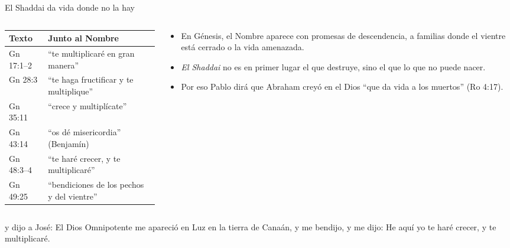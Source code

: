 \begin{frame}{El Shaddai da vida donde no la hay}
\begin{columns}[c,onlytextwidth]
\begin{column}{0.50\textwidth}
\scriptsize\renewcommand{\arraystretch}{1.15}
\begin{tabular}{@{}>{\RaggedRight\arraybackslash}p{1.5cm}>{\RaggedRight\arraybackslash}p{4.3cm}@{}}
\toprule
\textbf{Texto} & \textbf{Junto al Nombre} \\ \midrule
Gn 17:1--2 & ``te multiplicaré en gran manera'' \\
Gn 28:3 & ``te haga fructificar y te multiplique'' \\
Gn 35:11 & ``crece y multiplícate'' \\
Gn 43:14 & ``os dé misericordia'' (Benjamín) \\
Gn 48:3--4 & ``te haré crecer, y te multiplicaré'' \\
Gn 49:25 & ``bendiciones de los pechos y del vientre'' \\
\bottomrule
\end{tabular}
\end{column}
\begin{column}{0.48\textwidth}\small
\begin{itemize}
\item En Génesis, el Nombre aparece  con promesas de descendencia, a familias donde el vientre está cerrado o la vida amenazada.
\item \emph{El Shaddai} no es en primer lugar el que destruye, sino el que  lo que no puede nacer.
\item Por eso Pablo dirá que Abraham creyó en el Dios ``que da vida a los muertos'' (Ro 4:17).
\end{itemize}
\end{column}
\end{columns}\par\medskip
\begin{cita}y dijo a José: El Dios Omnipotente me apareció en Luz en la tierra de Canaán, y me bendijo, y me dijo: He aquí yo te haré crecer, y te multiplicaré.\end{cita}
\end{frame}

